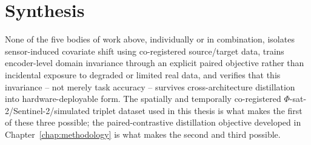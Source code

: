 \section{Synthesis}

None of the five bodies of work above, individually or in combination, isolates sensor-induced covariate shift using co-registered source/target data, trains encoder-level domain invariance through an explicit paired objective rather than incidental exposure to degraded or limited real data, and verifies that this invariance -- not merely task accuracy -- survives cross-architecture distillation into hardware-deployable form.
The spatially and temporally co-registered $\Phi$-sat-2/Sentinel-2/simulated triplet dataset used in this thesis is what makes the first of these three possible; the paired-contrastive distillation objective developed in Chapter~\ref{chap:methodology} is what makes the second and third possible.
